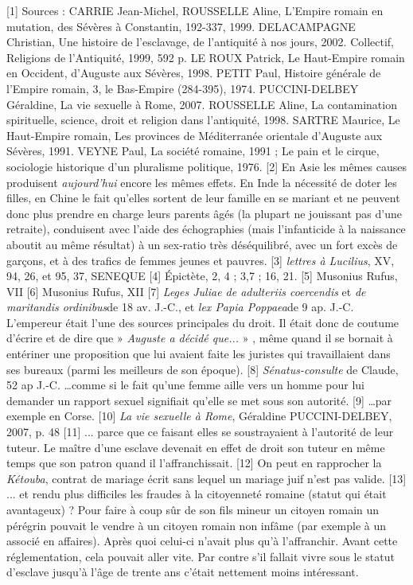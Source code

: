[1] Sources : CARRIE Jean-Michel, ROUSSELLE Aline, L'Empire romain en mutation, des Sévères à Constantin, 192-337, 1999. DELACAMPAGNE Christian, Une histoire de l'esclavage, de l'antiquité à nos jours, 2002. Collectif, Religions de l'Antiquité, 1999, 592 p. LE ROUX Patrick, Le Haut-Empire romain en Occident, d'Auguste aux Sévères, 1998. PETIT Paul, Histoire générale de l'Empire romain, 3, le Bas-Empire (284-395), 1974. PUCCINI-DELBEY Géraldine, La vie sexuelle à Rome, 2007. ROUSSELLE Aline, La contamination spirituelle, science, droit et religion dans l'antiquité, 1998. SARTRE Maurice, Le Haut-Empire romain, Les provinces de Méditerranée orientale d'Auguste aux Sévères, 1991. VEYNE Paul, La société romaine, 1991 ; Le pain et le cirque, sociologie historique d'un pluralisme politique, 1976.
[2] En Asie les mêmes causes produisent \emph{aujourd'hui} encore les mêmes effets. En Inde la nécessité de doter les filles, en Chine le fait qu'elles sortent de leur famille en se mariant et ne peuvent donc plus prendre en charge leurs parents âgés (la plupart ne jouissant pas d'une retraite), conduisent avec l'aide des échographies (mais l'infanticide à la naissance aboutit au même résultat) à un sex-ratio très déséquilibré, avec un fort excès de garçons, et à des trafics de femmes jeunes et pauvres.
[3] \emph{lettres à Lucilius}, XV, 94, 26, et 95, 37, SENEQUE
[4] Épictète, 2, 4 ; 3,7 ; 16, 21.
[5] Musonius Rufus, VII
[6] Musonius Rufus, XII
[7] \emph{Leges Juliae de adulteriis coercendis} et \emph{de maritandis ordinibus}de 18 av. J.-C., et \emph{lex Papia Poppaea}de 9 ap. J.-C. L'empereur était l'une des sources principales du droit. Il était donc de coutume d'écrire et de dire que » \emph{Auguste a décidé que...} » , même quand il se bornait à entériner une proposition que lui avaient faite les juristes qui travaillaient dans ses bureaux (parmi les meilleurs de son époque).
[8] \emph{Sénatus-consulte} de Claude, 52 ap J.-C. …comme si le fait qu'une femme aille vers un homme pour lui demander un rapport sexuel signifiait qu'elle se met sous son autorité.
[9] …par exemple en Corse.
[10] \emph{La vie sexuelle à Rome}, Géraldine PUCCINI-DELBEY, 2007, p. 48
[11] ... parce que ce faisant elles se soustrayaient à l'autorité de leur tuteur. Le maître d'une esclave devenait en effet de droit son tuteur en même temps que son patron quand il l'affranchissait.
[12] On peut en rapprocher la \emph{Kétouba}, contrat de mariage écrit sans lequel un mariage juif n'est pas valide.
[13] ... et rendu plus difficiles les fraudes à la citoyenneté romaine (statut qui était avantageux) ? Pour faire à coup sûr de son fils mineur un citoyen romain un pérégrin pouvait le vendre à un citoyen romain non infâme (par exemple à un associé en affaires). Après quoi celui-ci n'avait plus qu'à l'affranchir. Avant cette réglementation, cela pouvait aller vite. Par contre s'il fallait vivre sous le statut d'esclave jusqu'à l'âge de trente ans c'était nettement moins intéressant.